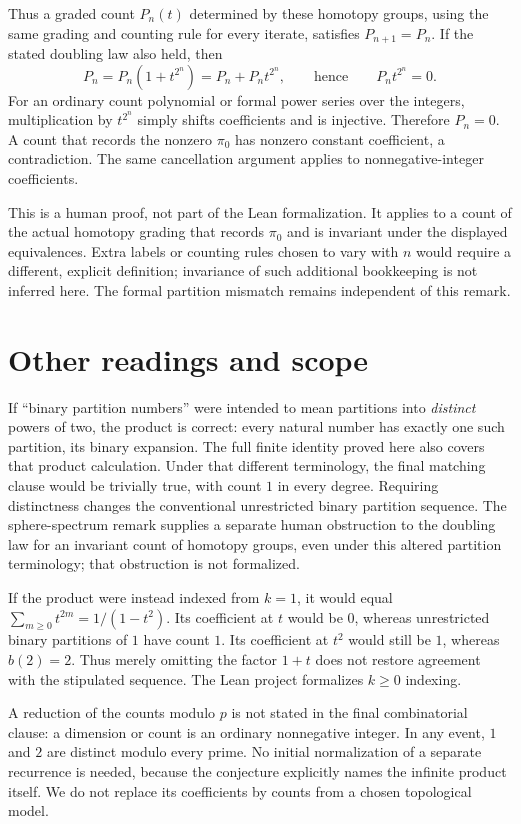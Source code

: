 \documentclass[11pt]{article}
\begin{document}
Thus a graded count $P_n(t)$ determined by these homotopy groups, using
the same grading and counting rule for every iterate, satisfies
$P_{n+1}=P_n$. If the stated doubling law also held, then
\[
P_n=P_n(1+t^{2^n})=P_n+P_n t^{2^n},
\qquad\text{hence}\qquad P_n t^{2^n}=0.
\]
For an ordinary count polynomial or formal power series over the
integers, multiplication by $t^{2^n}$ simply shifts coefficients and
is injective. Therefore $P_n=0$. A count that records the nonzero
$\pi_0$ has nonzero constant coefficient, a contradiction. The same
cancellation argument applies to nonnegative-integer coefficients.

This is a human proof, not part of the Lean formalization. It applies
to a count of the actual homotopy grading that records $\pi_0$ and is
invariant under the displayed equivalences. Extra labels or counting
rules chosen to vary with $n$ would require a different, explicit
definition; invariance of such additional bookkeeping is not inferred
here. The formal partition mismatch remains independent of this remark.

\section{Other readings and scope}
If ``binary partition numbers'' were intended to mean partitions into \emph{distinct} powers of two, the product is correct: every natural number has exactly one such partition, its binary expansion. The full finite identity proved here also covers that product calculation. Under that different terminology, the final matching clause would be trivially true, with count $1$ in every degree. Requiring distinctness changes the conventional unrestricted binary partition sequence. The sphere-spectrum remark supplies a separate human obstruction to the doubling law for an invariant count of homotopy groups, even under this altered partition terminology; that obstruction is not formalized.

If the product were instead indexed from $k=1$, it would equal $\sum_{m\geq0}t^{2m}=1/(1-t^2)$. Its coefficient at $t$ would be $0$, whereas unrestricted binary partitions of $1$ have count $1$. Its coefficient at $t^2$ would still be $1$, whereas $b(2)=2$. Thus merely omitting the factor $1+t$ does not restore agreement with the stipulated sequence. The Lean project formalizes $k\geq0$ indexing.

A reduction of the counts modulo $p$ is not stated in the final combinatorial clause: a dimension or count is an ordinary nonnegative integer. In any event, $1$ and $2$ are distinct modulo every prime. No initial normalization of a separate recurrence is needed, because the conjecture explicitly names the infinite product itself. We do not replace its coefficients by counts from a chosen topological model.
\end{document}
